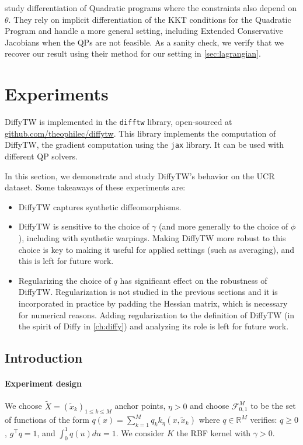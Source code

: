 \begin{remark}
    \cite{bambade,optnet,...} study differentiation of Quadratic programs where the constraints also depend on $\theta$. They rely on implicit differentiation of the KKT conditions for the Quadratic Program and handle a more general setting, including Extended Conservative Jacobians when the QPs are not feasible. As a sanity check, we verify that we recover our result using their method for our setting in \cref{sec:lagrangian}.
\end{remark}

\section{Experiments}
DiffyTW is implemented in the \texttt{difftw} library, open-sourced at \url{github.com/theophilec/diffytw}. This library implements the computation of DiffyTW, the gradient computation using the \texttt{jax} library. It can be used with different QP solvers.

In this section, we demonstrate and study DiffyTW's behavior on the UCR dataset. Some takeaways of these experiments are:

\begin{itemize}
    \item DiffyTW captures synthetic diffeomorphisms.
    \item DiffyTW is sensitive to the choice of $\gamma$ (and more generally to the choice of $\phi$), including with synthetic warpings. Making DiffyTW more robust to this choice is key to making it useful for applied settings (such as averaging), and this is left for future work.
    \item Regularizing the choice of $q$ has significant effect on the robustness of DiffyTW. Regularization is not studied in the previous sections and it is incorporated in practice by padding the Hessian matrix, which is necessary for numerical reasons. Adding regularization to the definition of DiffyTW (in the spirit of Diffy in \cref{ch:diffy}) and analyzing its role is left for future work.
\end{itemize}

\subsection{Introduction}

\paragraph{Experiment design}
We choose $\tilde X = (\tilde x_k)_{1\leq k \leq M}$ anchor points, $\eta >0$ and choose $\mathcal F_{0,1}^M$ to be the set of functions of the form $q(x) = \sum_{k=1}^Mq_k k_\eta(x, \tilde x_k)$ where $q\in\mathbb R^M$ verifies: $q \geq 0$, $g^\top q =1$, and $\int_0^1 q(u)du =1$.
We consider $K$ the RBF kernel with $\gamma> 0$.

